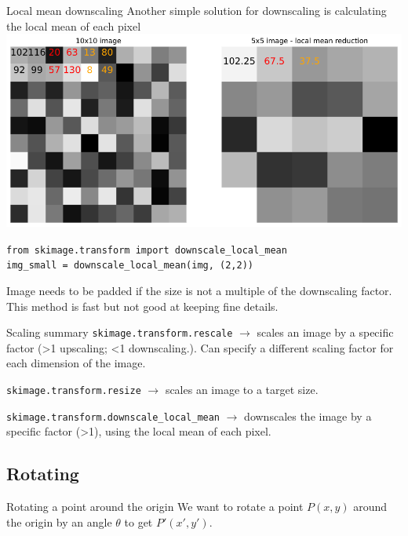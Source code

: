 \documentclass[9pt, aspectratio=169]{beamer}
\begin{document}
\begin{frame}
    {Local mean downscaling}
    Another simple solution for downscaling is calculating the local mean of each pixel
    \centering
    \includegraphics[width=.65\textwidth]{downscale.png}
    \pause
    \begin{codebox}
        \texttt{from skimage.transform import downscale\_local\_mean\\
            img\_small = downscale\_local\_mean(img, (2,2))}
    \end{codebox}

    Image needs to be padded if the size is not a multiple of the downscaling factor. This method is fast but not good at keeping fine details.
\end{frame}

\begin{frame}
    {Scaling summary}
    \texttt{skimage.transform.rescale} $\rightarrow$ scales an image by a specific factor (>1 upscaling; <1 downscaling.). Can specify a different scaling factor for each dimension of the image.
    \vspace{2em}

    \texttt{skimage.transform.resize} $\rightarrow$ scales an image to a target size.
    \vspace{2em}

    \texttt{skimage.transform.downscale\_local\_mean} $\rightarrow$ downscales the image by a specific factor (>1), using the local mean of each pixel.
\end{frame}

\subsection{Rotating}

\begin{frame}
    {Rotating a point around the origin}
    \centering
    We want to rotate a point $P (x,y)$ around the origin by an angle $\theta$ to get $P' (x',y')$.\\
\end{frame}
\end{document}

